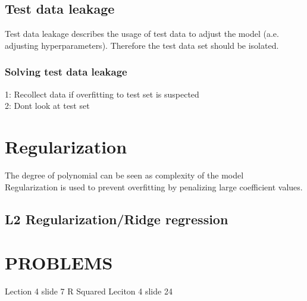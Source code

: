 \documentclass{article}
\begin{document}
\subsection{Test data leakage}
Test data leakage describes the usage of test data to adjust the model (a.e. adjusting hyperparameters). Therefore the test data set should be isolated.\\
\subsubsection{Solving test data leakage}
1: Recollect data if overfitting to test set is suspected\\
2: Dont look at test set 
\section{Regularization}
The degree of polynomial can be seen as complexity of the model\\
Regularization is used to prevent overfitting by penalizing large coefficient values. \\ 
\subsection{L2 Regularization/Ridge regression}

\section{PROBLEMS}
Lection 4 slide 7
R Squared
Leciton 4 slide 24
\end{document}
